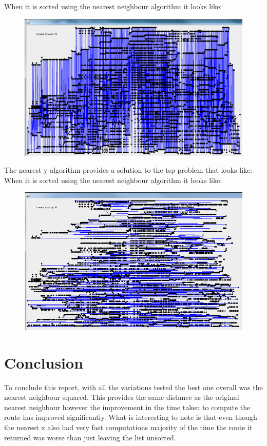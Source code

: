 \documentclass[conference,backref=page]{acmsiggraph}
\begin{document}
When it is sorted using the nearest neighbour algorithm it looks like:
\begin{figure}[h]
	\includegraphics[width=\columnwidth]{images/rl5915nx.png}
\end{figure}

The nearest y algorithm provides a solution to the tsp problem that looks like:
When it is sorted using the nearest neighbour algorithm it looks like:
\begin{figure}[h]
	\includegraphics[width=\columnwidth]{images/rl5915ny.png}
\end{figure}


\section{Conclusion}

To conclude this report, with all the variations tested the best one overall was the nearest neighbour squared. This provides the same distance as the original nearest neighbour however the improvement in the time taken to compute the route has improved significantly. What is interesting to note is that even though the nearest x also had very fast computations majority of the time the route it returned was worse than just leaving the list unsorted. 
\end{document}
